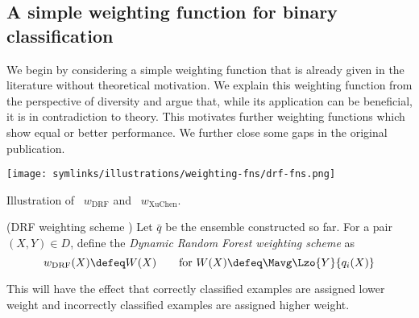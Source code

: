 \documentclass[../main.tex]{subfiles}
\begin{document}



\subsection{A simple weighting function for binary classification}

We begin by considering a simple weighting function that is already given in the literature without theoretical motivation. We explain this weighting function from the perspective of diversity and argue that, while its application can be beneficial, it is in contradiction to theory. This motivates further weighting functions which show equal or better performance. We further close some gaps in the original publication. 

\begin{marginfigure}
    \texttt{[image: symlinks/illustrations/weighting-fns/drf-fns.png]}
    \caption{Illustration of \tikzcircle[fill=blue]{3pt}~$w_{\text{DRF}}$ and \tikzcircle[fill=orange]{3pt}~$w_{\text{XuChen}}$.}
\end{marginfigure}
\begin{definition} (DRF weighting scheme \cite{bernard_DynamicRandomForests_2012})
Let $\bar{q}$ be the ensemble constructed so far. For a pair $(X,Y) \in D$, define the \textit{Dynamic Random Forest weighting scheme} as 
$$
w_{\text{DRF}}(X) \defeq W(X)
\hspace{2em} \text{for~}  W(X) \defeq \Mavg \Lzo{Y}{q_i(X)}
$$
\label{def:drf-weighting-scheme}
\end{definition}
This will have the effect that correctly classified examples are assigned lower weight and incorrectly classified examples are assigned higher weight.  %
\end{document}
